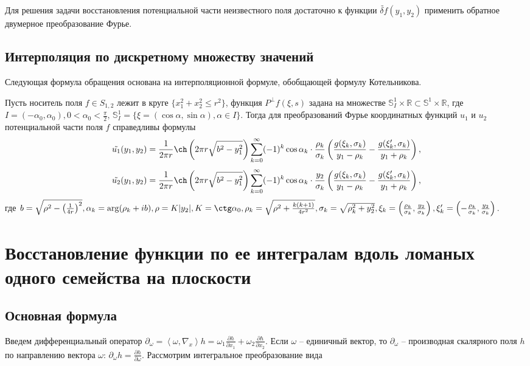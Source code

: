 Для решения задачи восстановления потенциальной части неизвестного поля достаточно к функции $\tilde{\delta f}(y_1, y_2)$ применить обратное двумерное преобразование Фурье.

\section{Интерполяция по дискретному множеству значений}

Следующая формула обращения основана на интерполяционной формуле, обобщающей формулу Котельникова.

\begin{theorem}
Пусть носитель поля $f\in S_{1,2}$ лежит в круге $\{x_1^2+x_2^2\leq r^2\}$, функция $P^\bot f(\xi,s)$ задана на множестве $\mathbb S^1_I\times \mathbb R\subset \mathbb S^1\times \mathbb R$, где $I=(-\alpha_0, \alpha_0), 0<\alpha_0<\frac{\pi}{2}, \, \mathbb S^1_I=\{\xi=(\cos \alpha, \sin \alpha), \alpha\in I\} $. Тогда для преобразований Фурье координатных функций $u_1$ и $u_2$ потенциальной части поля $f$ справедливы формулы
$$\tilde{u_1}(y_1,y_2)=\frac{1}{2\pi r}\ch\left(2\pi r\sqrt{b^2-y_1^2}\right)\sum\limits_{k=0}^\infty(-1)^k\cos \alpha_k \cdot\frac{\rho_k}{\sigma_k}\left(\frac{g(\xi_k,\sigma_k)}{y_1-\rho_k}-\frac{g(\xi_k',\sigma_k)}{y_1+\rho_k}\right),$$
$$\tilde{u_2}(y_1,y_2)=\frac{1}{2\pi r}\ch\left(2\pi r\sqrt{b^2-y_1^2}\right)\sum\limits_{k=0}^\infty(-1)^k\cos \alpha_k \cdot\frac{y_2}{\sigma_k}\left(\frac{g(\xi_k,\sigma_k)}{y_1-\rho_k}-\frac{g(\xi_k',\sigma_k)}{y_1+\rho_k}\right),$$
где $b=\sqrt{\rho^2-\left(\frac{1}{4r}\right)^2}, \alpha_k=\arg(\rho_k+ib), \rho=K|y_2|, K=\ctg \alpha_0, \rho_k=\sqrt{\rho^2+\frac{k(k+1)}{4r^2}}, \sigma_k=\sqrt{\rho_k^2+y_2^2}, \xi_k=\left(\frac{\rho_k}{\sigma_k},\frac{y_2}{\sigma_k}\right),  \xi_k'=\left(-\frac{\rho_k}{\sigma_k},\frac{y_2}{\sigma_k}\right)$.
\end{theorem}


\chapter{Восстановление функции по ее интегралам вдоль ломаных одного семейства на плоскости}

\section{Основная формула}
Введем дифференциальный оператор $\partial_\omega=\left<\omega,\nabla_x\right>h=\omega_1\frac{\partial h}{\partial x_1}+\omega_2\frac{\partial h}{\partial x_2}$. Если $\omega$ -- единичный вектор, то $\partial_\omega$ -- производная скалярного поля $h$ по направлению вектора $\omega$: $\partial_\omega h=\frac{\partial h}{\partial \omega}$.
Рассмотрим интегральное преобразование вида

